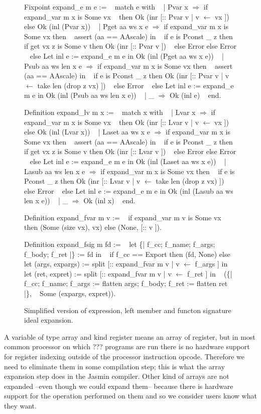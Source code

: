\documentclass{article}
\begin{document}
\begin{figure}[p]
\obeylines\obeyspaces\ttfamily%
Fixpoint expand\_e m e := 
~ match e with
~ | Pvar x \(\Rightarrow\) if expand\_var m x is Some vx
~   then Ok (inr [:: Pvar v | v \(\leftarrow\) vx ]) else Ok (inl (Pvar x))
~ | Pget aa ws x e \(\Rightarrow\) if expand\_var m x is Some vx then
~     assert (aa == AAscale) in
~     if e is Pconst \_ z then if get vx z is Some v then Ok (inr [:: Pvar v ])
~     else Error else Error
~   else Let inl e := expand\_e m e in Ok (inl (Pget aa ws x e))
~ | Psub aa ws len x e \(\Rightarrow\) if expand\_var m x is Some vx then
~     assert (aa == AAscale) in
~     if e is Pconst \_ z then Ok (inr [:: Pvar v | v \(\leftarrow\) take len (drop z vx) ])
~     else Error
~   else Let inl e := expand\_e m e in Ok (inl (Psub aa ws len x e))
~ | \_ \(\Rightarrow\) Ok (inl e)
~ end.

Definition expand\_lv m x :=
~ match x with
~ | Lvar x \(\Rightarrow\) if expand\_var m x is Some vx
~   then Ok (inr [:: Lvar v | v \(\leftarrow\) vx ]) else Ok (inl (Lvar x))
~ | Laset aa ws x e \(\Rightarrow\) if expand\_var m x is Some vx then
~     assert (aa == AAscale) in
~     if e is Pconst \_ z then if get vx z is Some v then Ok (inr [:: Lvar v ])
~     else Error else Error
~   else Let inl e := expand\_e m e in Ok (inl (Laset aa ws x e))
~ | Lasub aa ws len x e \(\Rightarrow\) if expand\_var m x is Some vx then
~     if e is Pconst \_ z then Ok (inr [:: Lvar v | v \(\leftarrow\) take len (drop z vx) ])
~     else Error
~   else Let inl e := expand\_e m e in Ok (inl (Lasub aa ws len x e))
~ | \_ \(\Rightarrow\) Ok (inl x)
~ end.

Definition expand\_fvar m v :=
~ if expand\_var m v is Some vx then (Some (size vx), vx) else (None, [:: v ]).

Definition expand\_fsig m fd :=
~ let \{| f\_cc; f\_name; f\_args; f\_body; f\_ret |\} := fd in
~ if f\_cc == Export then (fd, None) else
~ let (args, expargs) := split [:: expand\_fvar m v | v \(\leftarrow\) f\_args ] in
~ let (ret,  expret)  := split [:: expand\_fvar m v | v \(\leftarrow\) f\_ret  ] in
~ (\{| f\_cc; f\_name; f\_args := flatten args; f\_body; f\_ret := flatten ret |\},
~   Some (expargs, expret)).
\normalfont%
\caption{Simplified version of expression, left member and functon signature ideal expansion.}
\end{figure}

A variable of type array and kind register means an array of register, but in
most common processor on which ??? programs are run there is no hardware support
for register indexing outside of the processor instruction opcode. Therefore we
need to eliminate them in some compilation step; this is what the array
expansion step does in the Jasmin compiler. Other kind of arrays are not
expanded --even though we could expand them-- because there is hardware support
for the operation performed on them and so we consider users know what they want.
\end{document}

